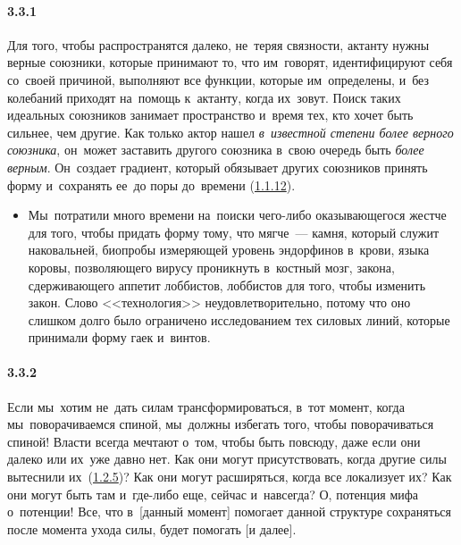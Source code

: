 \paragraph{3.3.1}\hypertarget{par:3.3.1}{} Для того, чтобы распространятся далеко, не~теряя связности, актанту нужны верные союзники, которые принимают то, что им~говорят, идентифицируют себя со~своей причиной, выполняют все функции, которые им~определены, и~без колебаний приходят на~помощь к~актанту, когда их~зовут. Поиск таких идеальных союзников занимает пространство и~время тех, кто хочет быть сильнее, чем другие. Как только актор нашел {\itshape в~известной степени более верного союзника}, он~может заставить другого союзника в~свою очередь быть {\itshape более верным}. Он~создает градиент, который обязывает других союзников принять форму и~сохранять ее~до поры до~времени (\hyperlink{par:1.1.12}{1.1.12}).
	\begin{itemize}
	\item 
 Мы~потратили много времени на~поиски чего-либо оказывающегося жестче для того, чтобы придать форму тому, что мягче~--- камня, который служит наковальней, биопробы измеряющей уровень эндорфинов в~крови, языка коровы, позволяющего вирусу проникнуть в~костный мозг, закона, сдерживающего аппетит лоббистов, лоббистов для того, чтобы изменить закон. Слово <<технология>> неудовлетворительно, потому что оно слишком долго было ограничено исследованием тех силовых линий, которые принимали форму гаек и~винтов.
	\end{itemize}

\paragraph{3.3.2}\hypertarget{par:3.3.2}{} Если мы~хотим не~дать силам трансформироваться, в~тот момент, когда мы~поворачиваемся спиной, мы~должны избегать того, чтобы поворачиваться спиной! Власти всегда мечтают о~том, чтобы быть повсюду, даже если они далеко или их~уже давно нет. Как они могут присутствовать, когда другие силы вытеснили их~(\hyperlink{par:1.2.5}{1.2.5})? Как они могут расширяться, когда все локализует их? Как они могут быть там и~где-либо еще, сейчас и~навсегда? О, потенция мифа о~потенции! Все, что в~[данный момент] помогает данной структуре сохраняться после момента ухода силы, будет помогать [и далее].

